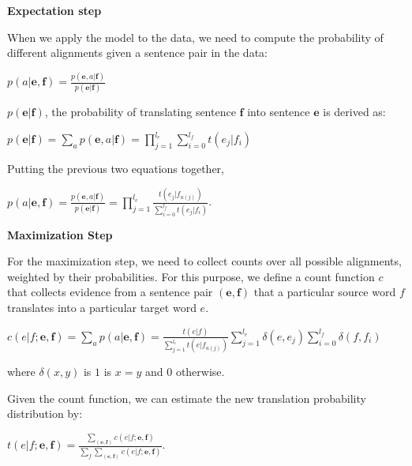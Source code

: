 \documentclass[10pt]{report}
\theoremstyle{plain}
\begin{document}
{ \textbf{Expectation step\\}

When we apply the model to the data, we need to compute the
probability of different alignments given a sentence pair in the
data:

\begin{center}
$p(a|\textbf{e},\textbf{f}) =
\frac{p(\textbf{e},a|\textbf{f})}{p(\textbf{e}|\textbf{f})}$
\end{center}

$p(\textbf{e}|\textbf{f})$, the probability of translating sentence
$\textbf{f}$ into sentence $\textbf{e}$ is derived as:

\begin{center}

$p(\textbf{e}|\textbf{f}) = \sum_a p(\textbf{e},a|\textbf{f}) =
\prod_{j=1}^{l_e} \sum_{i=0}^{l_f}t(e_j|f_i)$
\end{center}

Putting the previous two equations together,

\begin{center}

 $p(a|\textbf{e},\textbf{f}) =
\frac{p(\textbf{e},a|\textbf{f})}{p(\textbf{e}|\textbf{f})}
=\prod_{j=1}^{l_e} \frac {t(e_j | f_{a(j)})}{\sum_{i=0}^{l_f}
t(e_j|f_i)}$.


\end{center}

\textbf{Maximization Step}

For the maximization step, we need to collect counts over all
possible alignments, weighted by their probabilities. For this
purpose, we define a count function $c$ that collects evidence from
a sentence pair $(\textbf{e},\textbf{f})$ that a particular source
word $f$  translates into a particular target word $e$.

\begin{center}

$c(e|f;\textbf{e},\textbf{f}) = \sum_a p(a|\textbf{e},\textbf{f}) =
\frac{t(e|f)}{\sum_{j=1}^{l_e}t(e|f_{a(j)})} \sum_{j=1}^{l_e}
\delta(e,e_j)\sum_{i=0}^{l_f}\delta(f,f_i)$

\end{center}

where $\delta(x,y)$ is $1$ is $x=y$ and $0$ otherwise.

Given the count function, we can estimate the new translation
probability distribution by:

\begin{center}
$t(e|f;\textbf{e},\textbf{f}) =
\frac{\sum_{(\textbf{e},\textbf{f})}c(e|f;\textbf{e},\textbf{f})}{\sum_f\sum_{(\textbf{e},\textbf{f})}c(e|f;\textbf{e},\textbf{f})}$.
\end{center}


}
\end{document}
